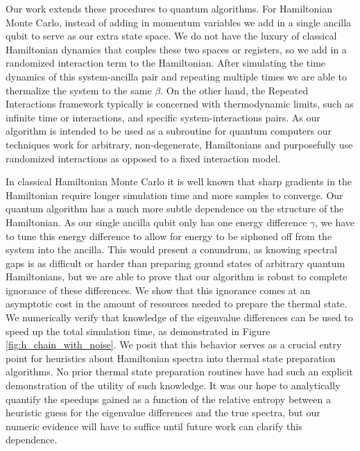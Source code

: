 \documentclass{article}
\begin{document}
Our work extends these procedures to quantum algorithms. For Hamiltonian Monte Carlo, instead of adding in momentum variables we add in a single ancilla qubit to serve as our extra state space. We do not have the luxury of classical Hamiltonian dynamics that couples these two spaces or registers, so we add in a randomized interaction term to the Hamiltonian. After simulating the time dynamics of this system-ancilla pair and repeating multiple times we are able to thermalize the system to the same $\beta$. On the other hand, the Repeated Interactions framework typically is concerned with thermodynamic limits, such as infinite time or interactions, and specific system-interactions pairs. As our algorithm is intended to be used as a subroutine for quantum computers our techniques work for arbitrary, non-degenerate, Hamiltonians and purposefully use randomized interactions as opposed to a fixed interaction model.

In classical Hamiltonian Monte Carlo it is well known that sharp gradients in the Hamiltonian require longer simulation time and more samples to converge. Our quantum algorithm has a much more subtle dependence on the structure of the Hamiltonian. As our single ancilla qubit only has one energy difference $\gamma$, we have to tune this energy difference to allow for energy to be siphoned off from the system into the ancilla. This would present a conundrum, as knowing spectral gaps is as difficult or harder than preparing ground states of arbitrary quantum Hamiltonians, but we are able to prove that our algorithm is robust to complete ignorance of these differences. We show that this ignorance comes at an asymptotic cost in the amount of resources needed to prepare the thermal state. We numerically verify that knowledge of the eigenvalue differences can be used to speed up the total simulation time, as demonstrated in Figure \ref{fig:h_chain_with_noise}. We posit that this behavior serves as a crucial entry point for heuristics about Hamiltonian spectra into thermal state preparation algorithms. No prior thermal state preparation routines have had such an explicit demonstration of the utility of such knowledge. It was our hope to analytically quantify the speedups gained as a function of the relative entropy between a heuristic guess for the eigenvalue differences and the true spectra, but our numeric evidence will have to suffice until future work can clarify this dependence.
\end{document}
